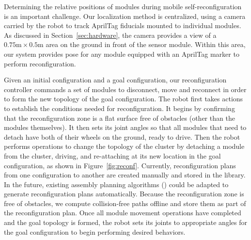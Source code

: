 \documentclass[journal]{IEEEtran}
\newcommand{\TODO}[1]{ {\bf \textcolor{red}{TODO:} #1 }}
\begin{document}
Determining the relative positions of modules during mobile self-reconfiguration is an important challenge. 
Our localization method is centralized, using a camera carried by the robot to track AprilTag fiducials mounted to individual modules.
As discussed in Section~\ref{sec:hardware}, the camera provides a view of a $0.75\text{m}\times0.5\text{m}$ area on the ground in front of the sensor module.  
Within this area, our system provides pose for any module equipped with an AprilTag marker to perform reconfiguration. 

Given an initial configuration and a goal configuration, our reconfiguration controller commands a set of modules to disconnect, move and reconnect in order to form the new topology of the goal configuration. 
The robot first takes actions to establish the conditions needed for reconfiguration. 
It begins by confirming that the reconfiguration zone is a flat surface free of obstacles (other than the modules themselves).
It then sets its joint angles so that all modules that need to detach have both of their wheels on the ground, ready to drive.
Then the robot performs operations to change the topology of the cluster by detaching a module from the cluster, driving, and re-attaching at its new location in the goal configuration, as shown in Figure~\ref{fig:reconf}.
Currently, reconfiguration plans from one configuration to another are created manually and stored in the library.  In the future, existing assembly planning algorithms (\cite{Werfel2007,Seo2013}) could be adapted to generate reconfiguration plans automatically.
Because the reconfiguration zone is free of obstacles, we compute collision-free paths offline and store them as part of the reconfiguration plan.
Once all module movement operations have completed and the goal topology is formed, the robot sets its joints to appropriate angles for the goal configuration to begin performing desired behaviors.
\end{document}
